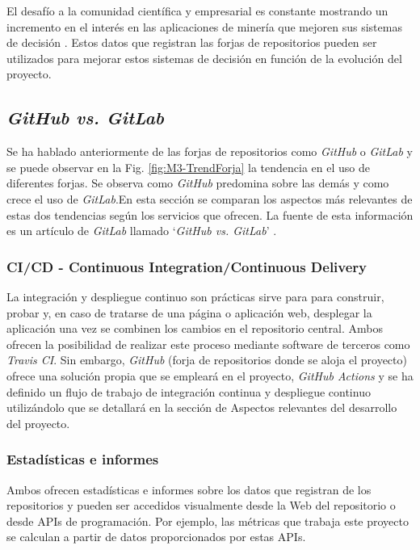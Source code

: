 El  desafío a la comunidad científica y empresarial  es constante mostrando un incremento en el interés en las aplicaciones de minería que mejoren sus sistemas de decisión \cite{guemes-pena_emerging_2018}. Estos datos que registran las forjas de repositorios pueden ser utilizados para mejorar estos sistemas de decisión en función de la evolución del proyecto.

\subsection{\textit{GitHub vs. GitLab}}\label{sect:3_2_1_GitHubVSGitLab}
Se ha hablado anteriormente de las forjas de repositorios como \textit{GitHub} o \textit{GitLab} y se puede observar en la Fig. \ref{fig:M3-TrendForja} la tendencia en el uso de diferentes forjas. Se observa como \textit{GitHub} predomina sobre las demás y como crece el uso de \textit{GitLab}.En esta sección se comparan los aspectos más relevantes de estas dos tendencias según los servicios que ofrecen. La fuente de esta información es un artículo de \textit{GitLab} llamado `\textit{GitHub vs. GitLab}' \cite{gitlab_github_nodate}.

\subsubsection{CI/CD - Continuous Integration/Continuous Delivery}
La integración y despliegue continuo son prácticas sirve para para construir, probar y, en caso de tratarse de una página o aplicación web, desplegar la aplicación una vez se combinen los cambios en el repositorio central. Ambos ofrecen la posibilidad de realizar este proceso mediante software de terceros como \textit{Travis CI}. Sin embargo, \textit{GitHub} (forja de repositorios donde se aloja el proyecto) ofrece una solución propia que se empleará en el proyecto, \textit{GitHub Actions} y se ha definido un flujo de trabajo de integración continua y despliegue continuo utilizándolo que se detallará en la sección de Aspectos relevantes del desarrollo del proyecto.


\subsubsection{Estadísticas e informes}
Ambos ofrecen estadísticas e informes sobre los datos que registran de los repositorios y pueden ser accedidos visualmente desde la Web del repositorio o desde APIs de programación. Por ejemplo, las métricas que trabaja este proyecto se calculan a partir de datos proporcionados por estas APIs.

